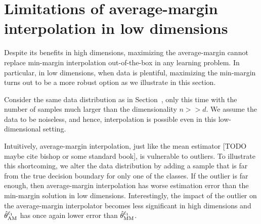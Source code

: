 \section{Limitations of average-margin interpolation in low dimensions}

Despite its benefits in high dimensions, maximizing the average-margin cannot
replace min-margin interpolation out-of-the-box in any learning problem. In
particular, in low dimensions, when data is plentiful, maximizing the min-margin
turns out to be a more robust option as we illustrate in this section.

Consider the same data distribution as in Section~, only this time with
the number of samples much larger than the dimensionality $n >> d$. We assume
the data to be noiseless, and hence, interpolation is possible even in this
low-dimensional setting.

Intuitively, average-margin interpolation, just like the mean estimator [TODO
maybe cite bishop or some standard book], is vulnerable to outliers.  To
illustrate this shortcoming, we alter the data distribution by adding a sample
that is far from the true decision boundary for only one of the classes.
If the outlier is far enough, then average-margin interpolation has worse
estimation error than the min-margin solution in low dimensions. Interestingly,
the impact of the outlier on the average-margin interpolator becomes less
significant in high dimensions and $\hat{\theta}^{\ell_1}_{\mathrm{AM}}$ has once again lower error than $\hat{\theta}^{\ell_1}_{\mathrm{MM}}$.

